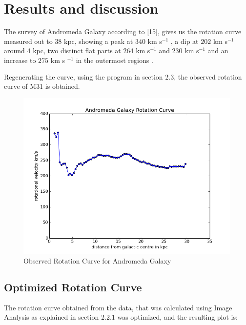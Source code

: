 	\chapter{Results and discussion}

The survey of Andromeda Galaxy according to [15], gives us the rotation curve measured out to $38$ kpc, showing a peak at $340$ km s$^{-1}$ , a dip at $202$ km s$^{-1}$ around $4$ kpc, two distinct flat parts at $264$ km s$^{-1}$  and $230$ km s$^{-1}$ and an increase to $275$  km s $^{-1}$ in the outermost regions \cite{observed}.
 
 Regenerating the curve, using the program in section $2.3$, the observed rotation curve of M31 is obtained.

\begin{figure} [h]
\centering
\includegraphics[scale=0.5]{rotcurve}
\caption{Observed Rotation Curve for Andromeda Galaxy}
\end{figure}

\section{Optimized Rotation Curve}

The rotation curve obtained from the data, that was calculated using Image Analysis as explained in section 2.2.1  was optimized, and the resulting plot is:

